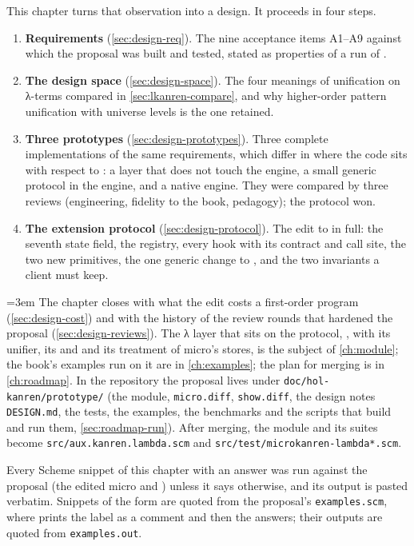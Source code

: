 This chapter turns that observation into a design. It proceeds in four steps.
\begin{enumerate}
\item \textbf{Requirements} (\cref{sec:design-req}). The nine acceptance items A1--A9 against which the
  proposal was built and tested, stated as properties of a run of .
\item \textbf{The design space} (\cref{sec:design-space}). The four meanings of unification on λ-terms
  compared in \cref{sec:lkanren-compare}, and why higher-order pattern unification with universe levels is
  the one retained.
\item \textbf{Three prototypes} (\cref{sec:design-prototypes}). Three complete implementations of the
  same requirements, which differ in where the code sits with respect to \micro: a layer that does not
  touch the engine, a small generic protocol in the engine, and a native engine. They were compared by
  three reviews (engineering, fidelity to the book, pedagogy); the protocol won.
\item \textbf{The extension protocol} (\cref{sec:design-protocol}). The edit to \micro{} in full: the
  seventh state field, the registry, every hook with its contract and call site, the two new primitives,
  the one generic change to , and the two invariants a client must keep.
\end{enumerate}
{\emergencystretch=3em
The chapter closes with what the edit costs a first-order program (\cref{sec:design-cost}) and with
the history of the review rounds that hardened the proposal (\cref{sec:design-reviews}).
The λ layer that sits on the protocol, , with its unifier, its  and
 and its treatment of micro's stores, is the subject of \cref{ch:module}; the book's examples
run on it are in \cref{ch:examples}; the plan for merging is in \cref{ch:roadmap}. In the repository the
proposal lives under \texttt{doc/hol-kanren/prototype/} (the module, \texttt{micro.diff},
\texttt{show.diff}, the design notes \texttt{DESIGN.md}, the tests, the examples, the benchmarks and the
scripts that build and run them, \cref{sec:roadmap-run}). After merging, the module and its suites
become \texttt{src/}\allowbreak\texttt{aux.kanren.lambda.scm} and
\texttt{src/}\allowbreak\texttt{test/}\allowbreak\texttt{microkanren-lambda*.scm}.\par}

Every Scheme snippet of this chapter with an answer was run against the proposal (the edited micro and
) unless it says otherwise, and its output is pasted verbatim. Snippets of the
form  are quoted from the proposal's \texttt{examples.scm}, where 
prints the label as a comment and then the answers; their outputs are quoted from
\texttt{examples.out}.

